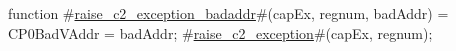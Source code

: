 function #\hyperref[sailMIPSzraisezyc2zyexceptionzybadaddr]{raise\_c2\_exception\_badaddr}#(capEx, regnum, badAddr) = {
    CP0BadVAddr = badAddr;
    #\hyperref[sailMIPSzraisezyc2zyexception]{raise\_c2\_exception}#(capEx, regnum);
}
